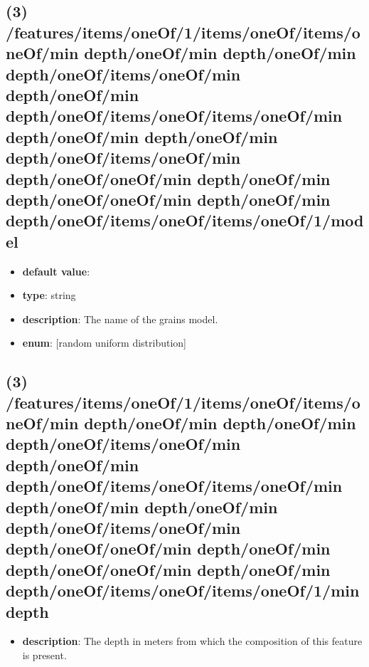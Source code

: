 \subsection{(3) /features/items/oneOf/1/items/oneOf/items/oneOf/min depth/oneOf/min depth/oneOf/min depth/oneOf/items/oneOf/min depth/oneOf/min depth/oneOf/items/oneOf/items/oneOf/min depth/oneOf/min depth/oneOf/min depth/oneOf/items/oneOf/min depth/oneOf/oneOf/min depth/oneOf/min depth/oneOf/oneOf/min depth/oneOf/min depth/oneOf/items/oneOf/items/oneOf/1/model}
\begin{itemize}[leftmargin=3em]\item {\bf default value}: 
\item {\bf type}: string
\item {\bf description}: The name of the grains model.
\item {\bf enum}: [random uniform distribution]\end{itemize}\subsection{(3) /features/items/oneOf/1/items/oneOf/items/oneOf/min depth/oneOf/min depth/oneOf/min depth/oneOf/items/oneOf/min depth/oneOf/min depth/oneOf/items/oneOf/items/oneOf/min depth/oneOf/min depth/oneOf/min depth/oneOf/items/oneOf/min depth/oneOf/oneOf/min depth/oneOf/min depth/oneOf/oneOf/min depth/oneOf/min depth/oneOf/items/oneOf/items/oneOf/1/min depth}
\begin{itemize}[leftmargin=3em]\item {\bf description}: The depth in meters from which the composition of this feature is present.
\end{itemize}
